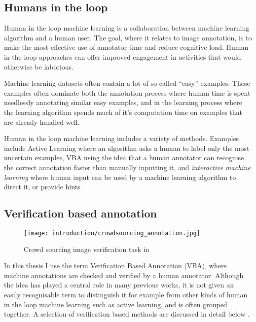 \subsection{Humans in the loop}

Human in the loop machine learning is a collaboration between machine learning algorithm and a human user. The goal, where it relates to image annotation, is to make the most effective use of annotator time and reduce cognitive load. Human in the loop approaches can offer improved engagement in activities that would otherwise be laborious.

Machine learning datasets often contain a lot of so called ``easy'' examples. These examples often dominate both the annotation process where human time is spent needlessly annotating similar easy examples, and in the learning process where the learning algorithm spends much of it's computation time on examples that are already handled well. 

Human in the loop machine learning includes a variety of methods. Examples include Active Learning where an algorithm asks a human to label only the most uncertain examples, \gls{VBA} using the idea that a human annotator can recognise the correct annotation faster than manually inputting it, and \emph{interactive machine learning} where human input can be used by a machine learning algorithm to direct it, or provide hints. 

\subsection{Verification based annotation}

\begin{figure}[h]
  \centering
  \texttt{[image: introduction/crowdsourcing\_annotation.jpg]}
  \caption{Crowd sourcing image verification task in \cite{Su2012a}} 
  \label{fig:crowdsourcing}
\end{figure}

In this thesis I use the term Verification Based Annotation (VBA), where machine annotations are checked and verified by a human annotator. Although the idea has played a central role in many previous works, it is not given an easily recognisable term to distinguish it for example from other kinds of human in the loop machine learning such as active learning, and is often grouped together. A selection of verification based methods are discussed in detail below \cite{Yao2012, McNeill2011, Adhikaria2018, Castrejon2017, Papadopoulos2016, Russakovsky2015a}. 

